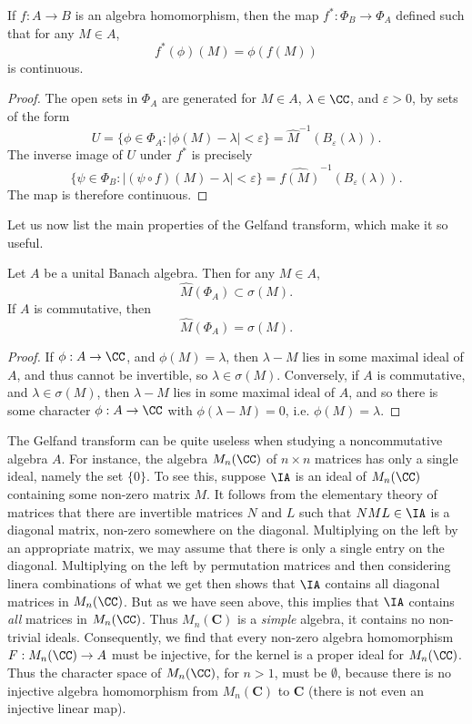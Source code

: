 \begin{theorem}
    If $f: A \to B$ is an algebra homomorphism, then the map $f^*: \Phi_B \to \Phi_A$ defined such that for any $M \in A$,
    \[ f^*(\phi)(M) = \phi(f(M)) \]
    is continuous.
\end{theorem}
\begin{proof}
    The open sets in $\Phi_A$ are generated for $M \in A$, $\lambda \in \CC$, and $\varepsilon > 0$, by sets of the form
    \[ U = \{ \phi \in \Phi_A: |\phi(M) - \lambda| < \varepsilon \} = \widehat{M}^{-1} \left( B_\varepsilon(\lambda) \right). \]
    The inverse image of $U$ under $f^*$ is precisely
    \[ \{ \psi \in \Phi_B : |(\psi \circ f)(M) - \lambda| < \varepsilon \} = \widehat{f(M)}^{-1} \left( B_\varepsilon(\lambda) \right). \]
    The map is therefore continuous.
\end{proof}

Let us now list the main properties of the Gelfand transform, which make it so useful.

\begin{theorem}
    Let $A$ be a unital Banach algebra. Then for any $M \in A$,
    \[ \widehat{M}(\Phi_A) \subset \sigma(M). \]
    If $A$ is commutative, then
    \[ \widehat{M}(\Phi_A) = \sigma(M). \]
\end{theorem}
\begin{proof}
    If $\phi: A \to \CC$, and $\phi(M) = \lambda$, then $\lambda - M$ lies in some maximal ideal of $A$, and thus cannot be invertible, so $\lambda \in \sigma(M)$. Conversely, if $A$ is commutative, and $\lambda \in \sigma(M)$, then $\lambda - M$ lies in some maximal ideal of $A$, and so there is some character $\phi: A \to \CC$ with $\phi(\lambda - M) = 0$, i.e. $\phi(M) = \lambda$.
\end{proof}

\begin{example}
    The Gelfand transform can be quite useless when studying a noncommutative algebra $A$. For instance, the algebra $M_n(\CC)$ of $n \times n$ matrices has only a single ideal, namely the set $\{ 0 \}$. To see this, suppose $\IA$ is an ideal of $M_n(\CC)$ containing some non-zero matrix $M$. It follows from the elementary theory of matrices that there are invertible matrices $N$ and $L$ such that $NML \in \IA$ is a diagonal matrix, non-zero somewhere on the diagonal. Multiplying on the left by an appropriate matrix, we may assume that there is only a single entry on the diagonal. Multiplying on the left by permutation matrices and then considering linera combinations of what we get then shows that $\IA$ contains all diagonal matrices in $M_n(\CC)$. But as we have seen above, this implies that $\IA$ contains \emph{all} matrices in $M_n(\CC)$. Thus $M_n(\mathbf{C})$ is a {\it simple} algebra, it contains no non-trivial ideals. Consequently, we find that every non-zero algebra homomorphism $F: M_n(\CC) \to A$ must be injective, for the kernel is a proper ideal for $M_n(\CC)$. Thus the character space of $M_n(\CC)$, for $n > 1$, must be $\emptyset$, because there is no injective algebra homomorphism from $M_n(\mathbf{C})$ to $\mathbf{C}$ (there is not even an injective linear map).
\end{example}

